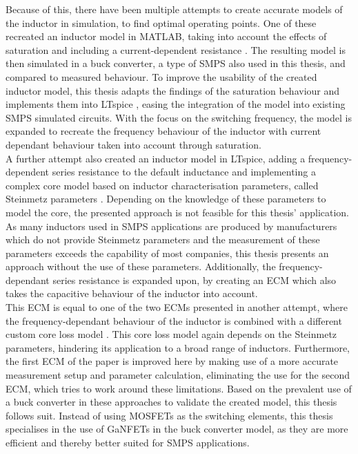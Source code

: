 Because of this, there have been multiple attempts to create accurate models of the inductor in simulation, to find optimal operating points. One of these recreated an inductor model in MATLAB, taking into account the effects of saturation and including a current-dependent resistance \cite{ECM_of_a_Ferrite_Core}. The resulting model is then simulated in a buck converter, a type of \ac{SMPS} also used in this thesis, and compared to measured behaviour. To improve the usability of the created inductor model, this thesis adapts the findings of the saturation behaviour and implements them into LTspice \cite{LTspice}, easing the integration of the model into existing \ac{SMPS} simulated circuits. With the focus on the switching frequency, the model is expanded to recreate the frequency behaviour of the inductor with current dependant behaviour taken into account through saturation.\\
A further attempt also created an inductor model in LTspice, adding a frequency-dependent series resistance to the default inductance and implementing a complex core model based on inductor characterisation parameters, called Steinmetz parameters \cite{Ridley_Inductor_Model}. Depending on the knowledge of these parameters to model the core, the presented approach is not feasible for this thesis' application. As many inductors used in \ac{SMPS} applications are produced by manufacturers which do not provide Steinmetz parameters and the measurement of these parameters exceeds the capability of most companies, this thesis presents an approach without the use of these parameters. Additionally, the frequency-dependant series resistance is expanded upon, by creating an \ac{ECM} which also takes the capacitive behaviour of the inductor into account.\\
This \ac{ECM} is equal to one of the two \acp{ECM} presented in another attempt, where the frequency-dependant behaviour of the inductor is combined with a different custom core loss model \cite{Comprehensive_SPICE_Model}. This core loss model again depends on the Steinmetz parameters, hindering its application to a broad range of inductors. Furthermore, the first \ac{ECM} of the paper is improved here by making use of a more accurate measurement setup and parameter calculation, eliminating the use for the second \ac{ECM}, which tries to work around these limitations.
Based on the prevalent use of a buck converter in these approaches to validate the created model, this thesis follows suit. Instead of using \acp{MOSFET} as the switching elements, this thesis specialises in the use of \acp{GaNFET} in the buck converter model, as they are more efficient and thereby better suited for \ac{SMPS} applications.\\

